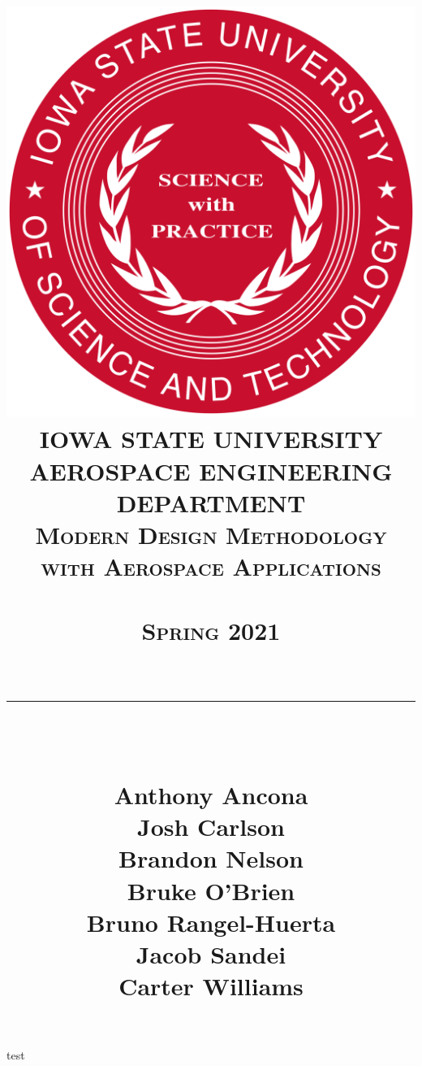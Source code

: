 \documentclass{article}
\title{
	\centering
	\vspace*{0.25 cm}
	\includegraphics[scale = 0.11]{isu_seal.png}\\[0.75 cm]	%
	\textsc{\LARGE IOWA STATE UNIVERSITY}\\[.75 cm]
	\textsc{\large AEROSPACE ENGINEERING DEPARTMENT}\\[0.2 cm]
	\textsc{\large Modern Design Methodology with Aerospace Applications}\\[0.2 cm]
	\textsc{\Large \hmwkClass}\\[0.5 cm]				%
	\textsc{\Large Spring 2021}\\[0.5 cm]				%
	\textsc{\Large \hmwkTitle}\\[0.2 cm]
	\rule{\linewidth}{0.2 mm} \\ [0.25 cm]
		\begin{minipage}{0.8\textwidth}
		\begin{flushleft}
		Anthony Ancona\\Josh Carlson\\Brandon Nelson\\ Bruke O'Brien\\Bruno Rangel-Huerta\\Jacob Sandei\\ Carter Williams
		\end{flushleft}
		\end{minipage}
}
\author{\hmwkAuthorName}
\date{}
\begin{document}
\maketitle
\pagebreak
test
\end{document}
